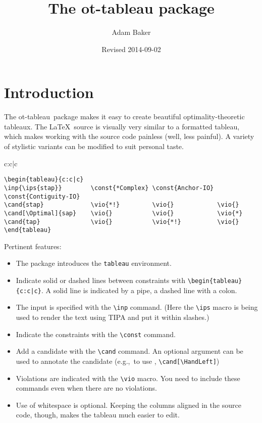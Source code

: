 \documentclass{article}
\title{The \textsf{ot-tableau} package}
\date{Revised 2014-09-02}
\author{Adam Baker}
\def\eg{e.g.,~}
\def\tabl{\textsf{ot-tableau}}
\begin{document}
\maketitle

\section{Introduction}
The \tabl\ package makes it easy to create beautiful optimality-theoretic tableaux. The \LaTeX\ source is visually very similar to a formatted tableau, which makes working with the source code painless (well, less painful). A variety of stylistic variants can be modified to suit personal taste.

\begin{center}
	\begin{tableau}{c:c|c}
	          
	             \vio{*!}         \vio{}            \vio{}
	    \vio{}           \vio{}            \vio{*}
	              \vio{}           \vio{*!}          \vio{}
	\end{tableau}
\end{center}

\begin{verbatim}
\begin{tableau}{c:c|c}
\inp{\ips{stap}}        \const{*Complex} \const{Anchor-IO} \const{Contiguity-IO}
\cand{stap}             \vio{*!}         \vio{}            \vio{}
\cand[\Optimal]{sap}    \vio{}           \vio{}            \vio{*}
\cand{tap}              \vio{}           \vio{*!}          \vio{}
\end{tableau}
\end{verbatim}
Pertinent features:
\begin{itemize}
\item The package introduces the \verb+tableau+ environment.
\item Indicate solid or dashed lines between constraints with \verb+\begin{tableau}{c:c|c}+. A solid line is indicated by a pipe, a dashed line with a colon.
\item The input is specified with the \verb+\inp+ command. (Here the \verb+\ips+ macro is being used to render the text using TIPA and put it within slashes.)
\item Indicate the constraints with the \verb+\const+ command.
\item Add a candidate with the \verb+\cand+ command. An optional argument can be used to annotate the candidate (\eg to use \HandLeft, \verb+\cand[\HandLeft]+)
\item Violations are indicated with the \verb+\vio+ macro. You need to include these commands even when there are no violations.
\item Use of whitespace is optional. Keeping the columns aligned in the source code, though, makes the tableau much easier to edit.
\end{itemize}
\end{document}
